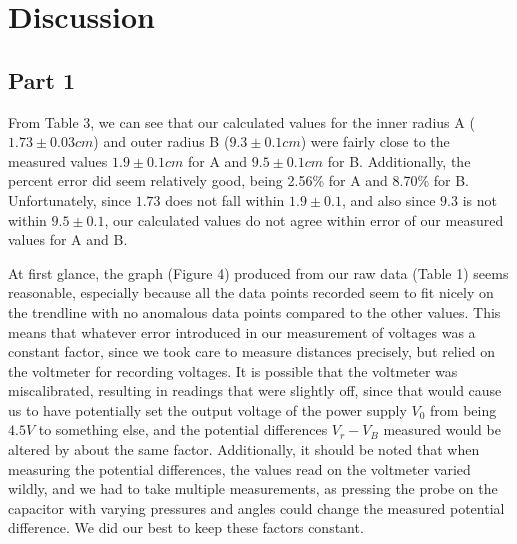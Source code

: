 \documentclass[letterpaper]{article}
\begin{document}
\section{Discussion}

\subsection{Part 1}
From Table 3, we can see that our calculated values for the inner radius A
($1.73 \pm 0.03 cm$)
and outer radius B
($9.3 \pm 0.1 cm$) were fairly close to the measured values $1.9 \pm 0.1 cm$ for A
and $ 9.5 \pm 0.1 cm$ for B.
Additionally, the percent error did seem relatively good, being 2.56\% for A and 8.70\% for B.
Unfortunately, since $1.73$ does not fall within $1.9 \pm 0.1$,
and also since $9.3$ is not within $9.5 \pm 0.1$, our calculated values do not
agree within error of our measured values for A and B.

At first glance, the graph (Figure 4) produced from our raw data (Table 1) seems reasonable, especially
because all the data points recorded seem to fit nicely on the trendline with
no anomalous data points compared to the other values. This means that whatever error
introduced in our measurement of voltages was a constant factor, since we took care
to measure distances precisely, but relied on the voltmeter for recording voltages.
It is possible that the voltmeter was miscalibrated, resulting in readings that were slightly off,
since that would cause us to have potentially set the output voltage of the power supply $V_0$ from being $4.5 V$ to something else,
and the potential differences $V_r-V_B$ measured would be altered by about the same factor. Additionally,
it should be noted that when measuring the potential differences, the values read on the voltmeter varied
wildly, and we had to take multiple measurements, as pressing the probe on the capacitor with varying pressures and
angles could change the measured potential difference. We did our best to keep these factors constant.
\end{document}

